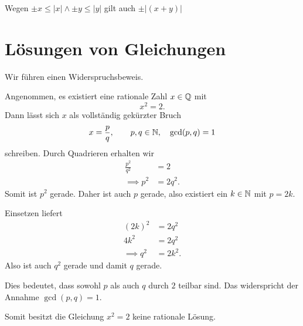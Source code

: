 
\begin{myproof}
	Wegen $\pm x \leq \vert x \vert \land \pm y \leq \vert y \vert$ gilt auch $\pm \vert (x + y) \vert$ 
\end{myproof}

\newpage
\section{Lösungen von Gleichungen}


\begin{myproof}
	Wir führen einen Widerspruchsbeweis.

	Angenommen, es existiert eine rationale Zahl $x\in\mathbb{Q}$ mit
	\[
	x^2=2.
	\]
	Dann lässt sich $x$ als vollständig gekürzter Bruch
	\[
	x=\frac{p}{q}, \qquad p,q\in\mathbb{N},\quad \gcd(p,q)=1
	\]
	schreiben. Durch Quadrieren erhalten wir
	\begin{align*}
		\frac{p^2}{q^2}&=2\\
		\implies p^2&=2q^2.
	\end{align*}
	Somit ist $p^2$ gerade. Daher ist auch $p$ gerade, also existiert ein $k\in\mathbb{N}$ mit $p=2k$.

	Einsetzen liefert
	\begin{align*}
		(2k)^2&=2q^2\\
		4k^2&=2q^2\\
		\implies q^2&=2k^2.
	\end{align*}
	Also ist auch $q^2$ gerade und damit $q$ gerade.

	Dies bedeutet, dass sowohl $p$ als auch $q$ durch $2$ teilbar sind. Das widerspricht der Annahme $\gcd(p,q)=1$.

	Somit besitzt die Gleichung $x^2=2$ keine rationale Lösung.
\end{myproof}


